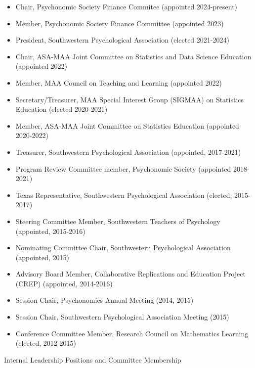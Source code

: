\documentclass[article,10pt]{article}
\begin{document}
\begin{itemize}
\item Chair, Psychonomic Society Finance Commitee (appointed 2024-present)
\item Member, Psychonomic Society Finance Committee (appointed 2023)
\item President, Southwestern Psychological Association (elected 2021-2024)
\item Chair, ASA-MAA Joint Committee on Statistics and Data Science Education (appointed 2022)
\item Member, MAA Council on Teaching and Learning (appointed 2022)
\item Secretary/Treasurer, MAA Special Interest Group (SIGMAA) on Statistics Education (elected 2020-2021)
\item Member, ASA-MAA Joint Committee on Statistics Education (appointed 2020-2022)
\item Treasurer, Southwestern Psychological Association (appointed, 2017-2021)
\item Program Review Committee member, Psychonomic Society (appointed 2018-2021)
\item Texas Representative, Southwestern Psychological Association (elected, 2015-2017)
\item Steering Committee Member, Southwestern Teachers of Psychology (appointed, 2015-2016)
\item Nominating Committee Chair, Southwestern Psychological Association (appointed, 2015)
\item Advisory Board Member, Collaborative Replications and Education Project (CREP) (appointed, 2014-2016)
\item Session Chair, Psychonomics Annual Meeting (2014, 2015)
\item Session Chair, Southwestern Psychological Association Meeting (2015)
\item Conference Committee Member, Research Council on Mathematics Learning (elected, 2012-2015)
\end{itemize}

Internal Leadership Positions and Committee Membership
\end{document}
